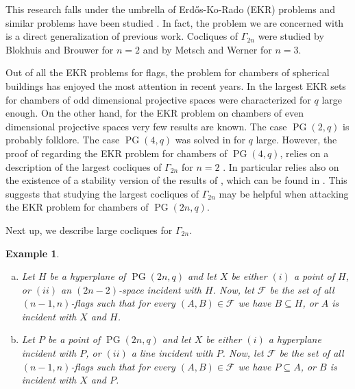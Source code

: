 \documentclass[11pt, oneside, a4paper]{article}
\newtheorem{example}[thm]{Example}
\newcommand{\EKR}{\mathcal{F}}
\DeclareMathOperator{\PG}{PG}
\begin{document}
This research falls under the umbrella of Erd\H{o}s-Ko-Rado (EKR) problems and similar problems have been studied \cite{pointhyperplaneflags, point-plane, k=3_Hilton_Milner, IMM18, Thechromaticnumberoftwo}. In fact, the problem we are concerned with is a direct generalization of previous work.
Cocliques of $\Gamma_{2n}$ were studied by  Blokhuis and Brouwer \cite{cocliquesonlineplane4d} for $n=2$ and by Metsch and Werner \cite{werner_metsch} for $n=3$.

Out of all the EKR problems for flags, the problem for chambers of spherical buildings has enjoyed the most attention in recent years.
In \cite{AlgebraicApproach, AlgebraicApproach2, klaus_jesse_philipp} the largest EKR sets for chambers of odd dimensional projective spaces were characterized for $q$ large enough. 
On the other hand, for the EKR problem on chambers of even dimensional projective spaces very few results are known.
 The case $\PG(2,q)$ is probably folklore. The case $\PG(4,q)$ was solved in \cite{heering_PG4q} for $q$ large. 
However, the proof of \cite{heering_PG4q} regarding the EKR problem for chambers of $\PG(4,q)$, relies on a description of the largest cocliques of $\Gamma_{2n}$ for $n=2$ \cite{cocliquesonlineplane4d}.
 In particular \cite{heering_PG4q} relies also on the existence of a stability version of the results of \cite{cocliquesonlineplane4d}, which can be found in \cite{DHAESELEER2022103474}. This suggests that studying the largest cocliques of $\Gamma_{2n}$ may be helpful when attacking the EKR problem for chambers of $\PG(2n,q)$.


Next up, we describe large cocliques for $\Gamma_{2n}$.
\begin{example} \label{E: main}
\begin{enumerate} [(a)]
    \item Let $H$ be a hyperplane of $\PG(2n,q)$ and let $X$ be either $(i)$ a point of $H$, or $(ii)$ an $(2n-2)$-space incident with $H$.
    Now, let $\EKR$ be the set of all $(n-1,n)$-flags such that for every $(A,B)\in \EKR$ we have $B\subseteq H$, or $A$ is incident with $X$ and $H$.
    \item Let $P$ be a point of $\PG(2n,q)$ and let $X$ be either $(i)$ a hyperplane incident with $P$, or $(ii)$ a line incident with $P$.
    Now, let $\EKR$ be the set of all $(n-1,n)$-flags such that for every $(A,B)\in \EKR$ we have $P\subseteq A$, or $B$ is incident with $X$ and $P$.
\end{enumerate}
\end{example}
\end{document}
